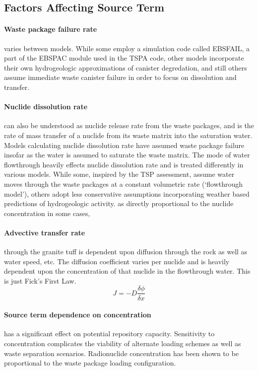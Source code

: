 \subsection{Factors Affecting Source Term}

\paragraph{Waste package failure rate} varies between models. While 
some employ a simulation code called EBSFAIL, a part of the EBSPAC 
module used in the TSPA code, other models incorporate their own 
hydrogeologic approximations of canister degredation, and still others 
assume immediate waste canister failure in order to focus on 
dissolution and transfer.  \newline



\paragraph{Nuclide dissolution rate} can also be understood as nuclide 
release rate from the waste packages, and is the rate of mass transfer 
of a nuclide from its waste matrix into the saturation water. Models 
calculating  nuclide dissolution rate have assumed waste package 
failure insofar as the water is assumed to saturate the waste matrix.  
The mode of water flowthrough heavily effects nuclide dissolution rate 
and is treated differently in various models. While some, inspired by 
the TSP assessment, assume water moves through the waste packages at a 
constant volumetric rate (`flowthrough model'), others adopt less 
conservative assumptions incorporating weather based predictions of 
hydrogeologic activity. as directly proportional to the nuclide 
concentration in some cases,  

\paragraph{Advective transfer rate} through the granite tuff is 
dependent upon diffusion through the rock as well as water speed, etc.  
The diffusion coefficient varies per nuclide and is heavily dependent 
upon the concentration of that nuclide in the flowthrough water. This 
is just Fick's First Law.  \begin{equation}
J = -D\frac{\delta\phi}{\delta x}
\end{equation}

\paragraph{Source term dependence on concentration} has a significant 
effect on potential repository capacity. Sensitivity to concentration 
complicates the viability of alternate loading schemes as well as 
waste separation scenarios. Radionuclide concentration has been shown 
to be proportional to the waste package loading 
configuration.\cite{ahn_relationship_2002,kawasaki_congruent_2004}

